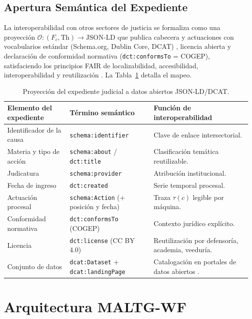 \documentclass[computers,article,submit,pdftex,moreauthors]{Definitions/mdpi}
\begin{document}
\subsection{Apertura Semántica del Expediente}

La interoperabilidad con otros sectores de justicia se formaliza como una proyección $\mathcal{O}: (F_c, \mathrm{Th}) \rightarrow \mathrm{JSON\text{-}LD}$ que publica cabecera y actuaciones con vocabularios estándar (Schema.org, Dublin Core, DCAT) \cite{Guha2016,Bizer2009}, licencia abierta y declaración de conformidad normativa (\texttt{dct:conformsTo} = COGEP), satisfaciendo los principios FAIR de localizabilidad, accesibilidad, interoperabilidad y reutilización \cite{Wilkinson2016}. La Tabla~\ref{tab:opendata} detalla el mapeo.

\begin{table}[H]
\caption{Proyección del expediente judicial a datos abiertos JSON-LD/DCAT.}
\label{tab:opendata}
\begin{tabularx}{\textwidth}{llX}
\toprule
\textbf{Elemento del expediente} & \textbf{Término semántico} & \textbf{Función de interoperabilidad}\\
\midrule
Identificador de la causa & \texttt{schema:identifier} & Clave de enlace intersectorial.\\
Materia y tipo de acción & \texttt{schema:about} / \texttt{dct:title} & Clasificación temática reutilizable.\\
Judicatura & \texttt{schema:provider} & Atribución institucional.\\
Fecha de ingreso & \texttt{dct:created} & Serie temporal procesal.\\
Actuación procesal & \texttt{schema:Action} (+ posición y fecha) & Traza $\tau(c)$ legible por máquina.\\
Conformidad normativa & \texttt{dct:conformsTo} (COGEP) & Contexto jurídico explícito.\\
Licencia & \texttt{dct:license} (CC BY 4.0) & Reutilización por defensoría, academia, veeduría.\\
Conjunto de datos & \texttt{dcat:Dataset} + \texttt{dcat:landingPage} & Catalogación en portales de datos abiertos \cite{Attard2015}.\\
\bottomrule
\end{tabularx}
\end{table}

\section{Arquitectura MALTG-WF}
\label{sec:arch}
\end{document}
